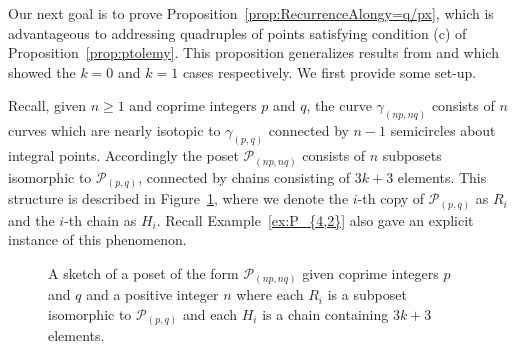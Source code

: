 \documentclass{article}
\theoremstyle{remark}
\newcommand{\calP}{\mathcal{P}}
\begin{document}
Our next goal is to prove Proposition~\ref{prop:RecurrenceAlongy=q/px}, which is  advantageous to addressing quadruples of points satisfying condition (c) of Proposition~\ref{prop:ptolemy}. This proposition generalizes results from \cite{LLRS} and \cite{banaian2024generalization} which showed the $k=0$ and $k=1$ cases respectively. We first provide some set-up.

Recall, given $n \geq 1$ and coprime integers $p$ and $q$, the curve $\gamma_{(np,nq)}$ consists of $n$ curves which are nearly isotopic to $\gamma_{(p,q)}$ connected by $n-1$ semicircles about integral points. Accordingly the poset $\calP_{(np,nq)}$ consists of $n$ subposets isomorphic to $\calP_{(p,q)}$, connected by chains consisting of $3k+3$ elements. This structure is described in Figure~\ref{fig:SketchPnpnq}, where we denote the $i$-th copy of $\calP_{(p,q)}$ as $R_i$ and the $i$-th chain as $H_i$. Recall Example~\ref{ex:P_{4,2}} also gave an explicit instance of this phenomenon.

\begin{figure}
\centering
{}
\caption{A sketch of a poset of the form $\calP_{(np,nq)}$ given coprime integers $p$ and $q$ and a positive integer $n$ where each $R_i$ is a subposet isomorphic to $\calP_{(p,q)}$ and each $H_i$ is a chain containing $3k+3$ elements. }\label{fig:SketchPnpnq}
\end{figure}
\end{document}
